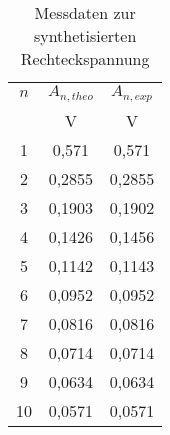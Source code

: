 
\begin{table}[h!]
  \centering
  \caption{Messdaten zur synthetisierten Rechteckspannung}
  \label{tab:säg}
  \begin{tabular}{c c c }
    \toprule
$n$  & $A_{n, theo}$ & $A_{n, exp}$ \\
      & V           & V               \\
    \midrule


    1	& 0,571 	&0,571	\\
    2	& 0,2855	&0,2855	\\
    3	& 0,1903	&0,1902	\\
    4	& 0,1426	&0,1456	\\
    5	& 0,1142	&0,1143	\\
    6	& 0,0952	&0,0952	\\
    7	& 0,0816	&0,0816	\\
    8	& 0,0714	&0,0714	\\
    9	& 0,0634	&0,0634	\\
    10&	0,0571	&0,0571	\\



    \bottomrule
  \end{tabular}
\end{table}
